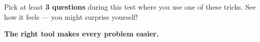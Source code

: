 {\begin{tcolorbox}[
    enhanced,
    colback=funYellowLight,
    colframe=funYellow!60,
    arc=10pt,
    boxrule=1pt,
    left=6mm, right=6mm, top=4mm, bottom=4mm,
]
\vspace{2mm}

Pick at least \textbf{3 questions} during this test where you use one of these tricks. See how it feels — you might surprise yourself!
\end{tcolorbox}

\vspace{4mm}

\begin{center}
{\large\bfseries\color{funOrangeDark} \faHammer\hspace{2mm}The right tool makes every problem easier.\hspace{2mm}\faHammer}
\end{center}

}
\newpage
